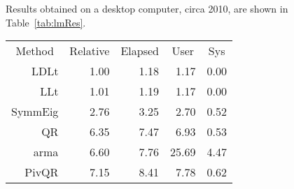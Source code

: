 \documentclass[shortnames,article,nojss]{jss}
\begin{document}
Results obtained on a desktop computer, circa 2010, are shown in
Table~\ref{tab:lmRes}.
\begin{table}[tb]
  \centering
  \begin{tabular}{r r r r r}
    \toprule
    \multicolumn{1}{c}{Method} & \multicolumn{1}{c}{Relative} &
    \multicolumn{1}{c}{Elapsed} & \multicolumn{1}{c}{User} &
    \multicolumn{1}{c}{Sys}\\
    \cmidrule(r){2-5}   %
     LDLt &    1.00 &    1.18 &      1.17 &     0.00 \\
      LLt &    1.01 &    1.19 &      1.17 &     0.00 \\
  SymmEig &    2.76 &    3.25 &      2.70 &     0.52 \\
       QR &    6.35 &    7.47 &      6.93 &     0.53 \\
     arma &    6.60 &    7.76 &     25.69 &     4.47 \\
    PivQR &    7.15 &    8.41 &      7.78 &     0.62 \\

\end{tabular}
\end{table}
\end{document}
